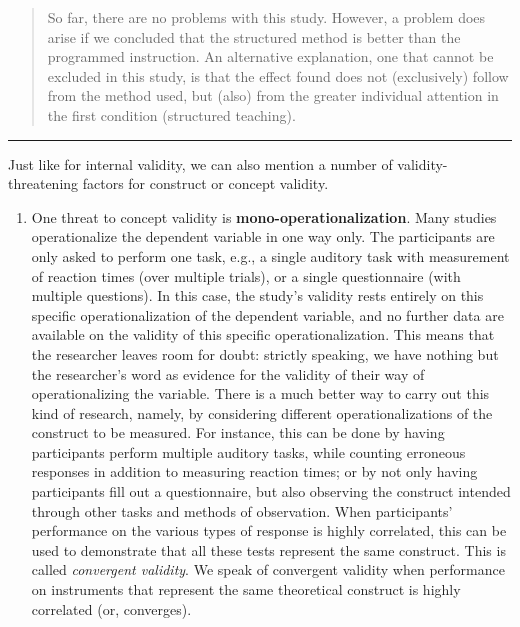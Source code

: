 \documentclass[
]{book}
\providecommand{\tightlist}{%
  \setlength{\itemsep}{0pt}\setlength{\parskip}{0pt}}
\begin{document}
\begin{quote}
So far, there are no problems with this study. However, a problem does arise if we concluded that the structured method is better than the programmed instruction. An alternative explanation, one that cannot be excluded in this study, is that the effect found does not (exclusively) follow from the method used, but (also) from the greater individual attention in the first condition (structured teaching).
\end{quote}

\begin{center}\rule{0.5\linewidth}{0.5pt}\end{center}

Just like for internal validity, we can also mention a number of validity-threatening factors for construct or concept validity.

\begin{enumerate}
\def\labelenumi{\arabic{enumi}.}
\tightlist
\item
  One threat to concept validity is \textbf{mono-operationalization}. Many studies operationalize the dependent variable in one way only. The participants are only asked to perform one task, e.g., a single auditory task with measurement of reaction times (over multiple trials), or a single questionnaire (with multiple questions). In this case, the study's validity rests entirely on this specific operationalization of the dependent variable, and no further data are available on the validity of this specific operationalization. This means that the researcher leaves room for doubt: strictly speaking, we have nothing but the researcher's word as evidence for the validity of their way of operationalizing the variable. There is a much better way to carry out this kind of research, namely, by considering different operationalizations of the construct to be measured. For instance, this can be done by having participants perform multiple auditory tasks, while counting erroneous responses in addition to measuring reaction times; or by not only having participants fill out a questionnaire, but also observing the construct intended through other tasks and methods of observation. When participants' performance on the various types of response is highly correlated, this can be used to demonstrate that all these tests represent the same construct. This is called \emph{convergent validity}. We speak of convergent validity when performance on instruments that represent the same theoretical construct is highly correlated (or, converges).
\end{enumerate}
\end{document}

